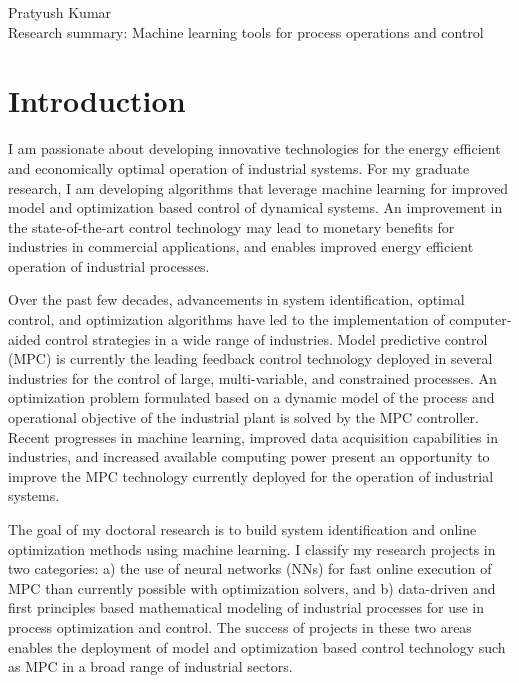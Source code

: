 \documentclass[11pt, a4paper]{article} %
\begin{document}
\noindent \large{Pratyush Kumar}
\vspace{0.1in} \\
Research summary: Machine learning tools for process operations and control
\normalsize	

\vspace{0.1in}
\section*{Introduction}

I am passionate about developing innovative technologies for the energy 
efficient and economically optimal operation of industrial systems. For my 
graduate research, I am developing algorithms that leverage machine learning 
for 
improved model and optimization based control of dynamical systems. An 
improvement in the 
state-of-the-art control technology may lead to monetary benefits for 
industries in commercial applications, and enables improved energy efficient 
operation of 
industrial processes.

Over the past few decades, advancements in system identification, optimal 
control, and optimization algorithms have led to the 
implementation of computer-aided control strategies in a wide range of 
industries. Model predictive control (MPC) is currently the leading feedback 
control technology deployed in several industries for the control of large, 
multi-variable, and constrained processes. An optimization 
problem formulated based on a dynamic 
model of the process and operational objective of the industrial plant is 
solved by the MPC  
controller. Recent 
progresses in machine 
learning, improved 
data acquisition 
capabilities in industries, and increased available computing power present an 
opportunity to improve the MPC technology currently deployed for 
the operation of industrial systems.

The goal of my doctoral research is to build system identification and 
online optimization methods using machine learning. I classify my 
research projects in two categories: a) the use of neural networks (NNs) for 
fast 
online 
execution of MPC than currently possible with optimization solvers, and b) 
data-driven 
and first 
principles based mathematical modeling of industrial processes for use in 
process optimization and control. The success of projects in these two areas 
enables the deployment of model and optimization based control technology such 
as MPC 
in a broad range of industrial sectors. 
\end{document}
